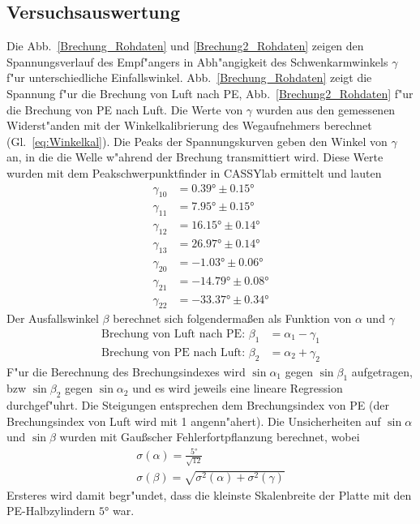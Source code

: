 \documentclass[12pt,a4paper]{article}
\begin{document}
\subsection{Versuchsauswertung}
Die Abb.~\ref{Brechung_Rohdaten} und \ref{Brechung2_Rohdaten} zeigen den Spannungsverlauf des Empf"angers in Abh"angigkeit des Schwenkarmwinkels $\gamma$ f"ur unterschiedliche Einfallswinkel. Abb.~\ref{Brechung_Rohdaten} zeigt die Spannung f"ur die Brechung von Luft nach PE, Abb.~\ref{Brechung2_Rohdaten}  f"ur die Brechung von PE nach Luft. Die Werte von $\gamma$ wurden aus den gemessenen Widerst"anden mit der Winkelkalibrierung des Wegaufnehmers berechnet (Gl.~\eqref{eq:Winkelkal}). Die Peaks der Spannungskurven geben den Winkel von $\gamma$ an, in die die Welle w"ahrend der Brechung transmittiert wird. Diese Werte wurden mit dem Peakschwerpunktfinder in CASSYlab ermittelt und lauten
\begin{align}
\gamma_{10}&=\ang{0.39}\pm\ang{0.15}\\
\gamma_{11}&=\ang{7.95}\pm\ang{0.15}\\
\gamma_{12}&=\ang{16.15}\pm\ang{0.14}\\
\gamma_{13}&=\ang{26.97}\pm\ang{0.14}\\
\gamma_{20}&=\ang{-1.03}\pm\ang{0.06}\\
\gamma_{21}&=\ang{-14.79}\pm\ang{0.08}\\
\gamma_{22}&=\ang{-33.37}\pm\ang{0.34}
\end{align}
Der Ausfallswinkel $\beta$ berechnet sich folgenderma\ss en als Funktion von $\alpha$ und $\gamma$
\begin{align}
\text{Brechung von Luft nach PE: }\beta_1&=\alpha_1-\gamma_1\\
\text{Brechung von PE nach Luft: }\beta_2&=\alpha_2+\gamma_2
\end{align} 
F"ur die Berechnung des Brechungsindexes wird $\sin{\alpha_1}$ gegen $\sin{\beta_1}$ aufgetragen, bzw $\sin{\beta_2}$ gegen $\sin{\alpha_2}$ und es wird jeweils eine lineare Regression durchgef"uhrt. Die Steigungen entsprechen dem Brechungsindex von PE (der Brechungsindex von Luft wird mit 1 angenn"ahert). Die Unsicherheiten auf $\sin{\alpha}$ und $\sin{\beta}$ wurden mit Gau\ss scher Fehlerfortpflanzung berechnet, wobei
\begin{align}
\sigma(\alpha)=\frac{\ang{5}}{\sqrt{12}}\\
\sigma(\beta)=\sqrt{\sigma^2(\alpha)+\sigma^2(\gamma)}
\end{align}
Ersteres wird damit begr"undet, dass die kleinste Skalenbreite der Platte mit den PE-Halbzylindern $\ang{5}$ war.
\end{document}

